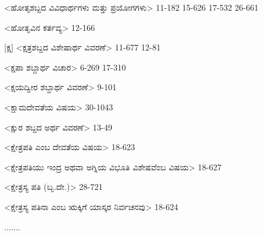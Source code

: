 <ಹೋತೃಶಬ್ದದ ವಿವಿಧಾರ್ಥಗಳು ಮತ್ತು ಪ್ರಯೋಗಗಳು>
11-182
15-626 
17-532
26-661

<ಹೋತೃವಿನ ಕರ್ತವ್ಯ>
12-166

[ಕ್ಷ]
<ಕ್ಷತ್ರಶಬ್ದದ ವಿಶೇಷಾರ್ಥ ವಿವರಣೆ>
11-677 
12-81

<ಕ್ಷಪಾ ಶಬ್ದಾರ್ಥ ವಿಚಾರ>
6-269 
17-310

<ಕ್ಷಯದ್ವೀರ ಶಬ್ದಾರ್ಥ ವಿವರಣೆ>
9-101

<ಕ್ಷಾಮದೇವತೆಯ ವಿಷಯ>
30-1043

<ಕ್ಷುರ ಶಬ್ದದ ಅರ್ಥ ವಿವರಣೆ>
13-49

<ಕ್ಷೇತ್ರಪತಿ ಎಂಬ ದೇವತೆಯ ವಿಷಯ>
18-623

<ಕ್ಷೇತ್ರಪತಿಯು ಇಂದ್ರ ಅಥವಾ ಅಗ್ನಿಯ ವಿಭೂತಿ ವಿಶೇಷವೆಂಬ ವಿಷಯ>
18-627

<ಕ್ಷೇತ್ರಸ್ಯ ಪತಿ (ಬೃ.ದೇ.)>
28-721

<ಕ್ಷೇತ್ರಸ್ಯ ಪತಿನಾ ಎಂಬ ಋಕ್ಕಿಗೆ ಯಾಸ್ಕರ ನಿರ್ವಚನವು>
18-624

.......
